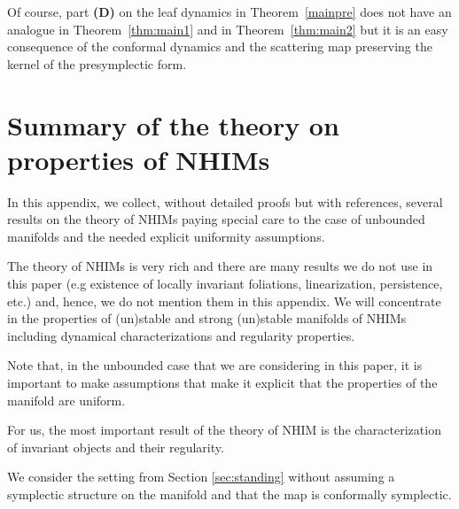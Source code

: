 \documentclass[11pt]{amsart}
\theoremstyle{definition}
\theoremstyle{remark}
\numberwithin{equation}{section}
\begin{document}
Of course, part \textbf{(D)}  on the leaf dynamics in Theorem~\ref{mainpre} does not have an analogue in Theorem~\ref{thm:main1} and in Theorem~\ref{thm:main2} but it is an easy consequence  of the conformal dynamics and the scattering map
preserving the kernel of the presymplectic form.



\appendix





\section{Summary of   the theory on  properties of  NHIMs}\label{sec:appendix_NHIM}



In this appendix, we collect, without detailed proofs but with
references,  several results on the theory of NHIMs
paying special care  to the case of unbounded manifolds
and the needed explicit uniformity assumptions.

The theory of NHIMs is very rich and there are many results
we do not use in this paper (e.g existence of locally invariant foliations,
linearization, persistence, etc.) and, hence, we do not mention
them in this appendix. We will concentrate in the
properties of (un)stable  and strong (un)stable manifolds of NHIMs
including dynamical characterizations and regularity properties.


Note that, in the unbounded case that we are considering in this paper,
it is important to make assumptions  that make it explicit that
the properties of the manifold are uniform.


For us, the most important result of  the theory of NHIM is
the characterization of invariant objects and their regularity.

We consider the setting from Section \ref{sec:standing} without assuming a symplectic structure on the manifold and that the map is conformally symplectic.
\end{document}
